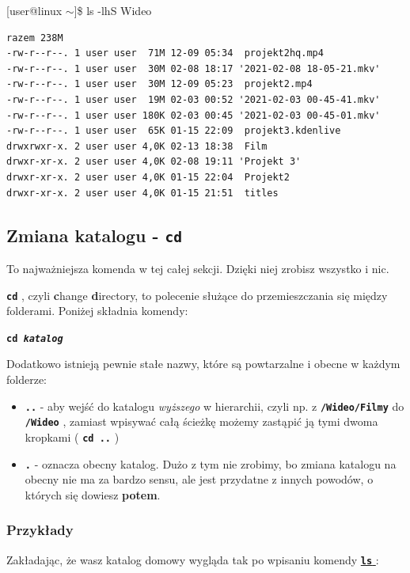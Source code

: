 \documentclass[12pt]{article}
\makeatletter
\newcommand{\ttbf}[1]{
    \texttt{\textbf{#1}}
}
\newenvironment{console1}
{
    \ttfamily
    \fontseries{b}
    \selectfont
    {[}user@linux $\sim${]}\$} {

    }
\makeatother
\begin{document}
\begin{enumerate}
\begin{console1}
    ls -lhS Wideo
\end{console1}

\begin{verbatim}
razem 238M
-rw-r--r--. 1 user user  71M 12-09 05:34  projekt2hq.mp4
-rw-r--r--. 1 user user  30M 02-08 18:17 '2021-02-08 18-05-21.mkv'
-rw-r--r--. 1 user user  30M 12-09 05:23  projekt2.mp4
-rw-r--r--. 1 user user  19M 02-03 00:52 '2021-02-03 00-45-41.mkv'
-rw-r--r--. 1 user user 180K 02-03 00:45 '2021-02-03 00-45-01.mkv'
-rw-r--r--. 1 user user  65K 01-15 22:09  projekt3.kdenlive
drwxrwxr-x. 2 user user 4,0K 02-13 18:38  Film
drwxr-xr-x. 2 user user 4,0K 02-08 19:11 'Projekt 3'
drwxr-xr-x. 2 user user 4,0K 01-15 22:04  Projekt2
drwxr-xr-x. 2 user user 4,0K 01-15 21:51  titles
\end{verbatim}
\end{enumerate}

\subsection{Zmiana katalogu - \texttt{cd}}
\label{sec:cd}

To najważniejsza komenda w tej całej sekcji. Dzięki niej zrobisz wszystko i nic.

\ttbf{cd}, czyli \textbf{c}hange \textbf{d}irectory, to polecenie służące do przemieszczania się między folderami. Poniżej składnia komendy:

\ttbf{cd \emph{katalog}}

Dodatkowo istnieją pewnie stałe nazwy, które są powtarzalne i obecne w każdym folderze:

\begin{itemize}
    \item \ttbf{..} - aby wejść do katalogu \emph{wyższego} w hierarchii, czyli np. z \ttbf{/Wideo/Filmy} do \ttbf{/Wideo}, zamiast wpisywać całą ścieżkę możemy zastąpić ją tymi dwoma kropkami (\ttbf{cd ..})
    \item \ttbf{.} - oznacza obecny katalog. Dużo z tym nie zrobimy, bo zmiana katalogu na obecny nie ma za bardzo sensu, ale jest przydatne z innych powodów, o których się dowiesz \textbf{potem}.
\end{itemize}

\subsubsection{Przykłady}

Zakładając, że wasz katalog domowy wygląda tak po wpisaniu komendy \hyperref[sec:ls]{\ttbf{ls}}:
\end{document}
